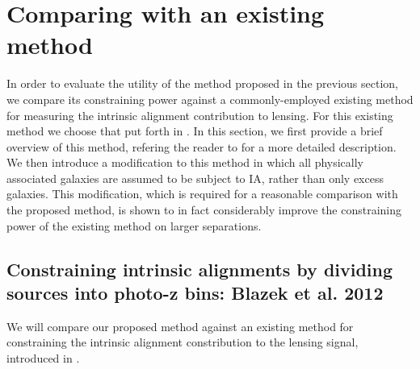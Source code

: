 \documentclass[a4paper,fleqn,usenatbib,useAMS]{mnras}
\begin{document}
\section{Comparing with an existing method}
\label{sec:existing}
In order to evaluate the utility of the method proposed in the previous section, we compare its constraining power against a commonly-employed existing method for measuring the intrinsic alignment contribution to lensing. For this existing method we choose that put forth in \cite{Blazek2012}. In this section, we first provide a brief overview of this method, refering the reader to \cite{Blazek2012} for a more detailed description. We then introduce a modification to this method in which all physically associated galaxies are assumed to be subject to IA, rather than only excess galaxies. This modification, which is required for a reasonable comparison with the proposed method, is shown to in fact considerably improve the constraining power of the existing method on larger separations.

\subsection{Constraining intrinsic alignments by dividing sources into photo-z bins: Blazek et al. 2012}
\label{subsec:introexisting}
We will compare our proposed method against an existing method for constraining the intrinsic alignment constribution to the lensing signal, introduced in \cite{Blazek2012}. 
\end{document}
